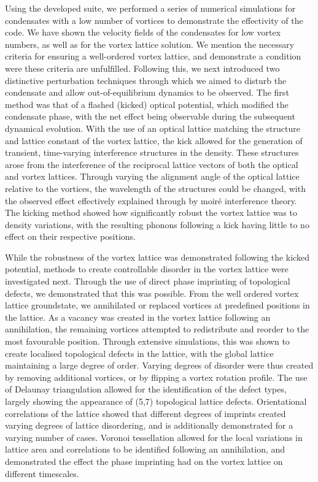 Using the developed suite, we performed a series of numerical simulations for condensates with a low number of vortices to demonstrate the effectivity of the code. We have shown the velocity fields of the condensates for low vortex numbers, as well as for the vortex lattice solution. We mention the necessary criteria for ensuring a well-ordered vortex lattice, and demonstrate a condition were these criteria are unfulfilled. Following this, we next introduced two distinctive perturbation techniques through which we aimed to disturb the condensate and allow out-of-equilibrium dynamics to be observed. The first method was that of a flashed (kicked) optical potential, which modified the condensate phase, with the net effect being observable during the subsequent dynamical evolution. With the use of an optical lattice matching the structure and lattice constant of the vortex lattice, the kick allowed for the generation of transient, time-varying interference structures in the density. These structures arose from the interference of the reciprocal lattice vectors of both the optical and vortex lattices. Through varying the alignment angle of the optical lattice relative to the vortices, the wavelength of the structures could be changed, with the observed effect effectively explained through by moir\'e interference theory. The kicking method showed how significantly robust the vortex lattice was to density variations, with the resulting phonons following a kick having little to no effect on their respective positions.

While the robustness of the vortex lattice was demonstrated following the kicked potential, methods to create controllable disorder in the vortex lattice were investigated next. Through the use of direct phase imprinting of topological defects, we demonstrated that this was possible. From the well ordered vortex lattice groundstate, we annihilated or replaced vortices at predefined positions in the lattice. As a vacancy was created in the vortex lattice following an annihilation, the remaining vortices attempted to redistribute and reorder to the most favourable position. Through extensive simulations, this was shown to create localised topological defects in the lattice, with the global lattice maintaining a large degree of order. Varying degrees of disorder were thus created by removing additional vortices, or by flipping a vortex rotation profile. The use of Delaunay triangulation allowed for the identification of the defect types, largely showing the appearance of (5,7) topological lattice defects. Orientational correlations of the lattice showed that different degrees of imprints created varying degrees of lattice disordering, and is additionally demonstrated for a varying number of cases. Voronoi tessellation allowed for the local variations in lattice area and correlations to be identified following an annihilation, and demonstrated the effect the phase imprinting had on the vortex lattice on different timescales.

